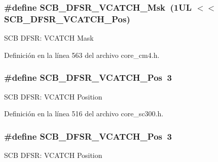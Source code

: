 \subsubsection[{\texorpdfstring{S\+C\+B\+\_\+\+D\+F\+S\+R\+\_\+\+V\+C\+A\+T\+C\+H\+\_\+\+Msk}{SCB_DFSR_VCATCH_Msk}}]{\setlength{\rightskip}{0pt plus 5cm}\#define S\+C\+B\+\_\+\+D\+F\+S\+R\+\_\+\+V\+C\+A\+T\+C\+H\+\_\+\+Msk~(1\+U\+L $<$$<$ S\+C\+B\+\_\+\+D\+F\+S\+R\+\_\+\+V\+C\+A\+T\+C\+H\+\_\+\+Pos)}\hypertarget{group___c_m_s_i_s___s_c_b_gacbb931575c07b324ec793775b7c44d05}{}\label{group___c_m_s_i_s___s_c_b_gacbb931575c07b324ec793775b7c44d05}
S\+CB D\+F\+SR\+: V\+C\+A\+T\+CH Mask 

Definición en la línea 563 del archivo core\+\_\+cm4.\+h.

\subsubsection[{\texorpdfstring{S\+C\+B\+\_\+\+D\+F\+S\+R\+\_\+\+V\+C\+A\+T\+C\+H\+\_\+\+Pos}{SCB_DFSR_VCATCH_Pos}}]{\setlength{\rightskip}{0pt plus 5cm}\#define S\+C\+B\+\_\+\+D\+F\+S\+R\+\_\+\+V\+C\+A\+T\+C\+H\+\_\+\+Pos~3}\hypertarget{group___c_m_s_i_s___s_c_b_gad02d3eaf062ac184c18a7889c9b6de57}{}\label{group___c_m_s_i_s___s_c_b_gad02d3eaf062ac184c18a7889c9b6de57}
S\+CB D\+F\+SR\+: V\+C\+A\+T\+CH Position 

Definición en la línea 516 del archivo core\+\_\+sc300.\+h.

\subsubsection[{\texorpdfstring{S\+C\+B\+\_\+\+D\+F\+S\+R\+\_\+\+V\+C\+A\+T\+C\+H\+\_\+\+Pos}{SCB_DFSR_VCATCH_Pos}}]{\setlength{\rightskip}{0pt plus 5cm}\#define S\+C\+B\+\_\+\+D\+F\+S\+R\+\_\+\+V\+C\+A\+T\+C\+H\+\_\+\+Pos~3}\hypertarget{group___c_m_s_i_s___s_c_b_gad02d3eaf062ac184c18a7889c9b6de57}{}\label{group___c_m_s_i_s___s_c_b_gad02d3eaf062ac184c18a7889c9b6de57}
S\+CB D\+F\+SR\+: V\+C\+A\+T\+CH Position 

